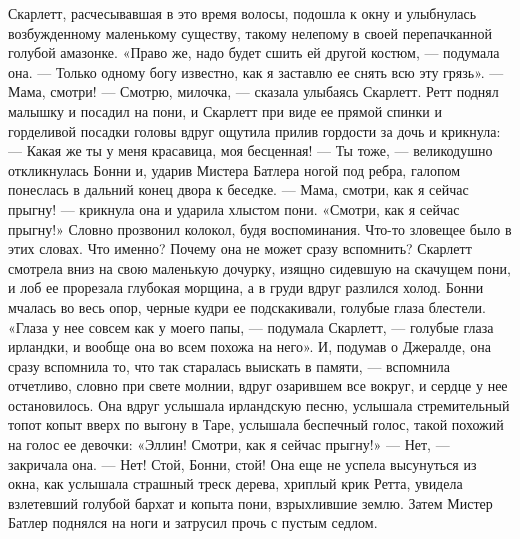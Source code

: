 Скарлетт, расчесывавшая в это время волосы, подошла к окну и улыбнулась возбужденному маленькому существу, такому нелепому в своей перепачканной голубой амазонке.
«Право же, надо будет сшить ей другой костюм, — подумала она. — Только одному богу известно, как я заставлю ее снять всю эту грязь».
— Мама, смотри!
— Смотрю, милочка, — сказала улыбаясь Скарлетт. Ретт поднял малышку и посадил на пони, и Скарлетт при виде ее прямой спинки и горделивой посадки головы вдруг ощутила прилив гордости за дочь и крикнула:
— Какая же ты у меня красавица, моя бесценная!
— Ты тоже, — великодушно откликнулась Бонни и, ударив Мистера Батлера ногой под ребра, галопом понеслась в дальний конец двора к беседке.
— Мама, смотри, как я сейчас прыгну! — крикнула она и ударила хлыстом пони.
«Смотри, как я сейчас прыгну!» Словно прозвонил колокол, будя воспоминания. Что-то зловещее было в этих словах. Что именно? Почему она не может сразу вспомнить? Скарлетт смотрела вниз на свою маленькую дочурку, изящно сидевшую на скачущем пони, и лоб ее прорезала глубокая морщина, а в груди вдруг разлился холод. Бонни мчалась во весь опор, черные кудри ее подскакивали, голубые глаза блестели.
«Глаза у нее совсем как у моего папы, — подумала Скарлетт, — голубые глаза ирландки, и вообще она во всем похожа на него».
И, подумав о Джералде, она сразу вспомнила то, что так старалась выискать в памяти, — вспомнила отчетливо, словно при свете молнии, вдруг озарившем все вокруг, и сердце у нее остановилось. Она вдруг услышала ирландскую песню, услышала стремительный топот копыт вверх по выгону в Таре, услышала беспечный голос, такой похожий на голос ее девочки: «Эллин! Смотри, как я сейчас прыгну!» — Нет, — закричала она. — Нет! Стой, Бонни, стой!
Она еще не успела высунуться из окна, как услышала страшный треск дерева, хриплый крик Ретта, увидела взлетевший голубой бархат и копыта пони, взрыхлившие землю. Затем Мистер Батлер поднялся на ноги и затрусил прочь с пустым седлом.




